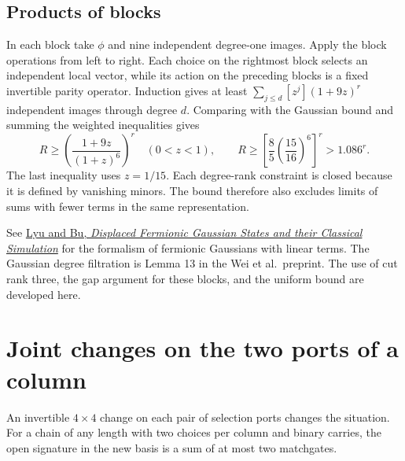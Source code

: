 \documentclass[11pt,a4paper]{article}
\numberwithin{equation}{section}
\begin{document}
\subsection{Products of blocks}\label{products-of-blocks}

In each block take \(\phi\) and nine independent degree-one images. Apply the block operations from left to right. Each choice on the rightmost block selects an independent local vector, while its action on the preceding blocks is a fixed invertible parity operator. Induction gives at least \(\sum_{j\le d}[z^j](1+9z)^r\) independent images through degree \(d\). Comparing with the Gaussian bound and summing the weighted inequalities gives
\begin{equation}\label{eq:uniform-rank-bound}
R\ge\left(\frac{1+9z}{(1+z)^6}\right)^r
\quad(0<z<1),
\qquad
R\ge \left[\frac85\left(\frac{15}{16}\right)^6\right]^r
>1.086^r .
\end{equation}
The last inequality uses \(z=1/15\). Each degree-rank constraint is closed because it is defined by vanishing minors. The bound therefore also excludes limits of sums with fewer terms in the same representation.

See \href{https://arxiv.org/abs/2411.18517}{Lyu and Bu, \emph{Displaced Fermionic Gaussian States and their Classical Simulation}} for the formalism of fermionic Gaussians with linear terms. The Gaussian degree filtration is Lemma 13 in the Wei et al.~preprint. The use of cut rank three, the gap argument for these blocks, and the uniform bound are developed here.

\section{Joint changes on the two ports of a column}\label{joint-changes-on-the-two-ports-of-a-column}

An invertible \(4\times4\) change on each pair of selection ports changes the situation. For a chain of any length with two choices per column and binary carries, the open signature in the new basis is a sum of at most two matchgates.
\end{document}
